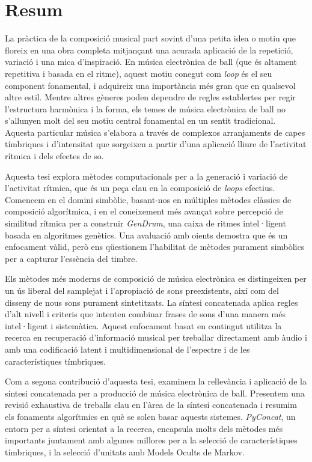 
\chapter{Resum}

La pràctica de la composició musical part sovint d'una petita idea o motiu que floreix en una obra completa mitjançant una acurada aplicació de la repetició, variació i una mica d'inspiració. En música electrònica de ball (que és altament repetitiva i basada en el ritme), aquest motiu conegut com \textit{loop} és el seu component fonamental, i adquireix una importància més gran que en qualsevol altre estil. Mentre altres gèneres poden dependre de regles establertes per regir l'estructura harmònica i la forma, els temes de música electrònica de ball no s'allunyen molt del seu motiu central fonamental en un sentit tradicional. Aquesta particular música s'elabora a través de complexos arranjaments de capes tímbriques i d'intensitat que sorgeixen a partir d'una aplicació lliure de l'activitat rítmica i dels efectes de so.

Aquesta tesi explora mètodes computacionals per a la generació i variació de l'activitat rítmica, que és un peça clau en la composició de \textit{loops} efectius. Comencem en el domini simbòlic, basant-nos en múltiples mètodes clàssics de composició algorítmica, i en el coneixement més avançat sobre percepció de similitud rítmica per a construir \textit{GenDrum}, una caixa de ritmes intel·ligent basada en algoritmes genètics. Una avaluació amb oients demostra que és un enfocament vàlid, però ens qüestionem l'habilitat de mètodes purament simbòlics per a capturar l'essència del timbre.

Els mètodes més moderns de composició de música electrònica es distingeixen per un ús liberal del samplejat i l'apropiació de sons preexistents, així com del disseny de nous sons purament sintetitzats. La síntesi concatenada aplica regles d'alt nivell i criteris que intenten combinar frases de sons d'una manera més intel·ligent i sistemàtica. Aquest enfocament basat en contingut utilitza la recerca en recuperació d'informació musical per treballar directament amb àudio i amb una codificació latent i multidimensional de l’espectre i de les característiques tímbriques.

Com a segona contribució d'aquesta tesi, examinem la rellevància i aplicació de la síntesi concatenada per a producció de música electrònica de ball. Presentem una revisió exhaustiva de treballs clau en l'àrea de la síntesi concatenada i resumim els fonaments algorítmics en què se solen basar aquests sistemes. \textit{PyConcat}, un entorn per a síntesi orientat a la recerca, encapsula molts dels mètodes més importants juntament amb algunes millores per a la selecció de característiques tímbriques, i la selecció d'unitats amb Models Ocults de Markov.

